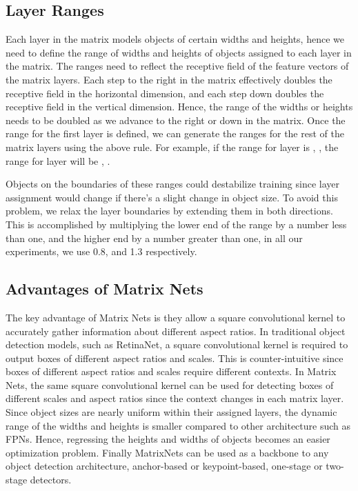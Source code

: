 \documentclass[10pt,twocolumn,letterpaper]{article}
\begin{document}
\subsection{Layer Ranges}
\vspace{-0.25cm}
Each layer in the matrix models objects of certain widths and heights, hence we need to define the range of widths and heights of objects assigned to each layer in the matrix. The ranges need to reflect the receptive field of the feature vectors of the matrix layers. Each step to the right in the matrix effectively doubles the receptive field in the horizontal dimension, and each step down doubles the receptive field in the vertical dimension. Hence, the range of the widths or heights needs to be doubled as we advance to the right or down in the matrix. Once the range for the first layer  is defined, we can generate the ranges for the rest of the matrix layers using the above rule. For example, if the range for layer  is , , the range for layer  will be , . 

Objects on the boundaries of these ranges could destabilize training since layer assignment would change if there's a slight change in object size. To avoid this problem, we relax the layer boundaries by extending them in both directions. This is accomplished by multiplying the lower end of the range by a number less than one, and the higher end by a number greater than one, in all our experiments, we use 0.8, and 1.3 respectively.

\subsection{Advantages of Matrix Nets}
The key advantage of Matrix Nets is they allow a square convolutional kernel to accurately gather information about different aspect ratios. In traditional object detection models, such as RetinaNet, a square convolutional kernel is required to output boxes of different aspect ratios and scales. This is counter-intuitive since boxes of different aspect ratios and scales require different contexts. In Matrix Nets, the same square convolutional kernel can be used for detecting boxes of different scales and aspect ratios since the context changes in each matrix layer. Since object sizes are nearly uniform within their assigned layers, the dynamic range of the widths and heights is smaller compared to other architecture such as FPNs. Hence, regressing the heights and widths of objects becomes an easier optimization problem. Finally MatrixNets can be used as a backbone to any object detection architecture, anchor-based or keypoint-based, one-stage or two-stage detectors.
\end{document}
